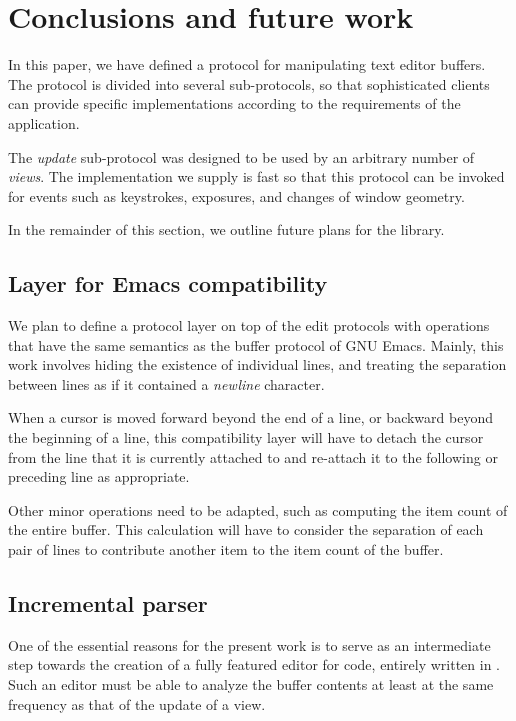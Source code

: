 \section{Conclusions and future work}

In this paper, we have defined a \clos{} protocol for manipulating
text editor buffers.  The protocol is divided into several
sub-protocols, so that sophisticated clients can provide specific
implementations according to the requirements of the application.

The \emph{update} sub-protocol was designed to be used by an arbitrary
number of \emph{views}.  The implementation we supply is fast so that
this protocol can be invoked for events such as keystrokes, exposures,
and changes of window geometry.

In the remainder of this section, we outline future plans for the
library.

\subsection{Layer for Emacs compatibility}

We plan to define a protocol layer on top of the edit protocols with
operations that have the same semantics as the buffer protocol of GNU
Emacs.  Mainly, this work involves hiding the existence of individual
lines, and treating the separation between lines as if it contained a
\emph{newline} character.

When a cursor is moved forward beyond the end of a line, or backward
beyond the beginning of a line, this compatibility layer will have to
detach the cursor from the line that it is currently attached to and
re-attach it to the following or preceding line as appropriate.

Other minor operations need to be adapted, such as computing the item
count of the entire buffer.  This calculation will have to consider
the separation of each pair of lines to contribute another item to the
item count of the buffer.

\subsection{Incremental \commonlisp{} parser}

One of the essential reasons for the present work is to serve as an
intermediate step towards the creation of a fully featured editor for
\commonlisp{} code, entirely written in \commonlisp{}.  Such an editor
must be able to analyze the buffer contents at least at the same
frequency as that of the update of a view.

